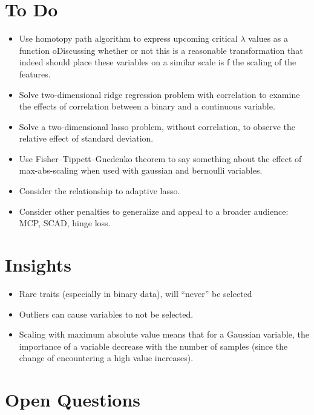 \section{To Do}

\begin{itemize}
  \item Use homotopy path algorithm to express upcoming critical \(\lambda\) values as a function oDiscussing whether or not this is a reasonable transformation that indeed should place these variables on a similar scale is f the scaling of the features.
  \item Solve two-dimensional ridge regression problem with correlation to examine the effects of correlation between a binary and a continuous variable.
  \item Solve a two-dimensional lasso problem, without correlation, to observe the relative effect of standard deviation.
  \item Use Fisher–Tippett–Gnedenko theorem to say something about the effect of max-abs-scaling when used with gaussian and bernoulli variables.
  \item Consider the relationship to adaptive lasso.
  \item Consider other penalties to generalize and appeal to a broader audience: MCP, SCAD, hinge loss.
\end{itemize}

\section{Insights}

\begin{itemize}
  \item Rare traits (especially in binary data), will ``never'' be selected
  \item Outliers can cause variables to not be selected.
  \item Scaling with maximum absolute value means that for a Gaussian variable, the importance of a variable decrease with the number of samples (since the change of encountering a high value increases).
\end{itemize}

\section{Open Questions}

